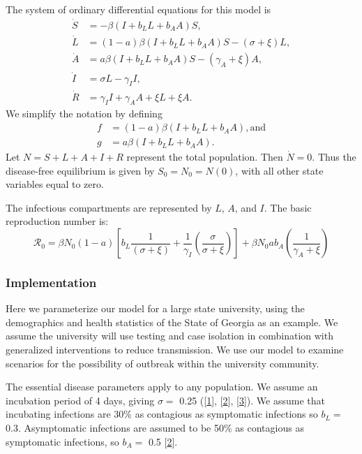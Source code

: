 \documentclass[
]{article}
\begin{document}
The system of ordinary differential equations for this model is
\begin{align*}
\dot{S} & =-\beta\left(I+b_{L}L+b_{A}A\right)S,\\
\dot{L} & =\left(1-a\right)\beta\left(I+b_{L}L+b_{A}A\right)S-\left(\sigma+\xi\right)L,\\
\dot{A} & =a\beta\left(I+b_{L}L+b_{A}A\right)S-\left(\gamma_{A}+\xi\right)A,\\
\dot{I} & =\sigma L-\gamma_{I}I,\\
\dot{R} & =\gamma_{I}I+\gamma_{A}A+\xi L+\xi A.
\end{align*} We simplify the notation by defining \begin{align*}
f & =\left(1-a\right)\beta\left(I+b_{L}L+b_{A}A\right), \text{and}\\
g & =a\beta\left(I+b_{L}L+b_{A}A\right).
\end{align*} Let \(N=S+L+A+I+R\) represent the total population. Then
\(\dot{N}=0\). Thus the disease-free equilibrium is given by
\(S_{0}=N_{0}=N\left(0\right)\), with all other state variables equal to
zero.

The infectious compartments are represented by \(L\), \(A\), and \(I\).
The basic reproduction number is: \[
\mathcal{R}_{0}=\beta N_{0}\left(1-a\right)\left[b_{L}\frac{1}{\left(\sigma+\xi\right)}+\frac{1}{\gamma_{I}}\left(\frac{\sigma}{\sigma+\xi}\right)\right]+\beta N_{0}ab_{A}\left(\frac{1}{\gamma_{A}+\xi}\right)
\]

\hypertarget{implementation}{%
\subsubsection{Implementation}\label{implementation}}

Here we parameterize our model for a large state university, using the
demographics and health statistics of the State of Georgia as an
example. We assume the university will use testing and case isolation in
combination with generalized interventions to reduce transmission. We
use our model to examine scenarios for the possibility of outbreak
within the university community.

The essential disease parameters apply to any population. We assume an
incubation period of 4 days, giving \(\sigma=\) 0.25
({[}\protect\hyperlink{ref-Zhang2020-ih}{1}{]},
{[}\protect\hyperlink{ref-Li2020-hc}{2}{]},
{[}\protect\hyperlink{ref-Lauer2020-mr}{3}{]}). We assume that
incubating infections are 30\% as contagious as symptomatic infections
so \(b_{L}=\) 0.3. Asymptomatic infections are assumed to be 50\% as
contagious as symptomatic infections, so \(b_{A} =\) 0.5
{[}\protect\hyperlink{ref-Li2020-hc}{2}{]}.
\end{document}
